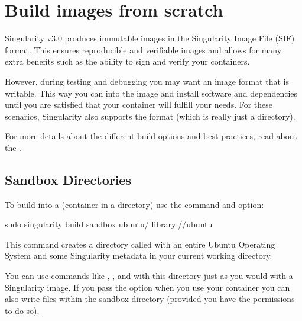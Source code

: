 \documentclass[letterpaper,10pt,english]{sphinxmanual}
\begin{document}
\section{Build images from scratch}
\label{\detokenize{quick_start:build-images-from-scratch}}\label{\detokenize{quick_start:id3}}\label{\detokenize{quick_start:sec-buildimagesfromscratch}}
Singularity v3.0 produces immutable images in the Singularity Image File (SIF)
format. This ensures reproducible and verifiable images and allows for many
extra benefits such as the ability to sign and verify your containers.

However, during testing and debugging you may want an image format that is
writable. This way you can  into the image and install software and
dependencies until you are satisfied that your container will fulfill your
needs. For these scenarios, Singularity also supports the  format
(which is really just a directory).

For more details about the different build options and best practices,
read about the .


\subsection{Sandbox Directories}
\label{\detokenize{quick_start:sandbox-directories}}
To build into a  (container in a directory) use the
 command and option:

%
\begin{sphinxVerbatim}[commandchars=\\\{\}]
\PYGZdl{} sudo singularity build \PYGZhy{}\PYGZhy{}sandbox ubuntu/ library://ubuntu
\end{sphinxVerbatim}

This command creates a directory called  with an entire Ubuntu
Operating System and some Singularity metadata in your current working
directory.

You can use commands like ,  , and  with this directory
just as you would with a Singularity image. If you pass the 
option when you use your container you can also write files within the sandbox
directory (provided you have the permissions to do so).
\end{document}
